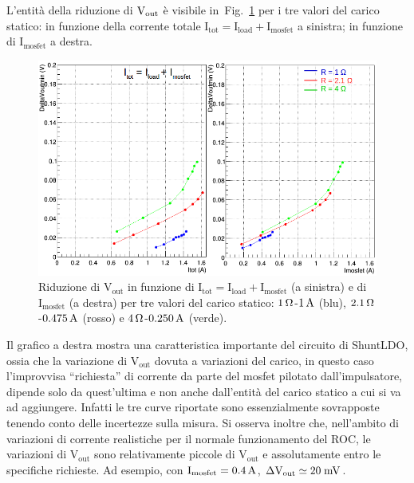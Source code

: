 L'entit\`a della riduzione di $\mathrm{V_{out}}$ \`e visibile in~Fig.~\ref{VoutUnd} per i tre valori del carico statico: in funzione della corrente totale $\mathrm{I_{tot} = I_{load}+I_{mosfet}}$ a sinistra; in funzione di $\mathrm{I_{mosfet}}$ a destra. 
\begin{figure}
\centering
\includegraphics[width=0.9\linewidth]{Immagini/VoutUnd}
\caption{Riduzione di $\mathrm{V_{out}}$ in funzione di $\mathrm{I_{tot} = I_{load}+I_{mosfet}}$ (a sinistra) e di $\mathrm{I_{mosfet}}$ (a destra) per tre valori del carico statico: $1{\rm \, \Omega}$-$1\rm \, A$ (blu), $2.1{\rm \, \Omega}$-$0.475\rm \, A$ (rosso) e $4{\rm \, \Omega}$-$0.250\rm \, A$ (verde).}
\label{VoutUnd}
\end{figure}
Il grafico a destra mostra una caratteristica importante del circuito di ShuntLDO, ossia che la variazione di $\mathrm{V_{out}}$ dovuta a variazioni del carico, in questo caso l'improvvisa ``richiesta'' di corrente da parte del mosfet pilotato dall'impulsatore, dipende solo da quest'ultima e non anche dall'entit\`a del carico statico a cui si va ad aggiungere. Infatti le tre curve riportate sono essenzialmente sovrapposte tenendo conto delle incertezze sulla misura.
Si osserva inoltre che, nell'ambito di variazioni di corrente realistiche per il normale funzionamento del ROC, le variazioni di $\mathrm{V_{out}}$ sono relativamente piccole di $\mathrm{V_{out}}$ e assolutamente entro le specifiche richieste. Ad esempio, con $\mathrm{I_{mosfet}= 0.4\rm \, A}$, $\mathrm{\Delta V_{out} \simeq 20\rm \; mV}$.

